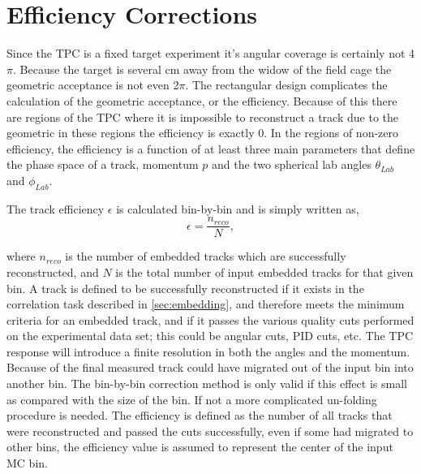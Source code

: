 \section{Efficiency Corrections}
\label{sec:efficiency}

Since the \spirit TPC is a fixed target experiment it's angular coverage is certainly not 4$\pi$. Because the target is several cm away from the widow of the field cage the geometric acceptance is not even 2$\pi$. The rectangular design complicates the calculation of the geometric acceptance, or the efficiency. Because of this there are regions of the TPC where it is impossible to reconstruct a track due to the geometric in these regions the efficiency is exactly 0. In the regions of non-zero efficiency, the efficiency is a function of at least three main parameters that define the phase space of a track, momentum $p$ and the two spherical lab angles $\theta_{Lab}$ and $\phi_{Lab}$. 

The track efficiency $\epsilon$ is calculated bin-by-bin and is simply written as, 
\begin{equation}
\epsilon = \frac{n_{reco}}{N},
\end{equation}

where $n_{reco}$ is the number of embedded tracks which are successfully reconstructed, and $N$ is the total number of input embedded tracks for that given bin. A track is defined to be successfully reconstructed if it exists in the correlation task described in \ref{sec:embedding}, and therefore meets the minimum criteria for an embedded track, and if it passes the various quality cuts performed on the experimental data set; this could be angular cuts, PID cuts, etc. The TPC response will introduce a finite resolution in both the angles and the momentum. Because of the final measured track could have migrated out of the input bin into another bin. The bin-by-bin correction method is only valid if this effect is small as compared with the size of the bin. If not a more complicated un-folding procedure is needed. The efficiency is defined as the number of all tracks that were reconstructed and passed the cuts successfully, even if some had migrated to other bins, the efficiency value is assumed to represent the center of the input MC bin.  

